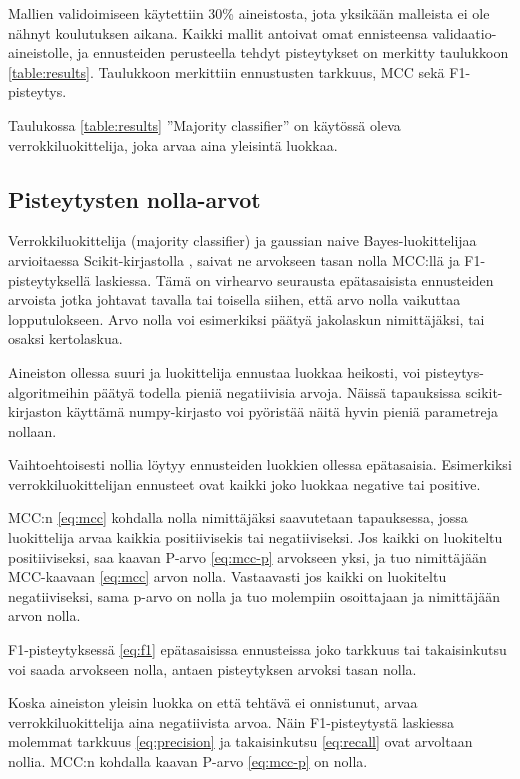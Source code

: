 \documentclass[finnish,twoside,openright]{HYgraduMLDS}
\begin{document}
Mallien validoimiseen käytettiin 30\% aineistosta, jota yksikään malleista ei ole nähnyt koulutuksen aikana. Kaikki mallit antoivat omat ennisteensa validaatio-aineistolle, ja ennusteiden perusteella tehdyt pisteytykset on merkitty taulukkoon \ref{table:results}. Taulukkoon merkittiin ennustusten tarkkuus, MCC sekä F1-pisteytys.

Taulukossa \ref{table:results} ''Majority classifier'' on käytössä oleva verrokkiluokittelija, joka arvaa aina yleisintä luokkaa. 


\subsection{Pisteytysten nolla-arvot}

Verrokkiluokittelija (majority classifier) ja gaussian naive Bayes-luokittelijaa arvioitaessa Scikit-kirjastolla \cite{scikit-learn}, saivat ne arvokseen tasan nolla MCC:llä ja F1-pisteytyksellä laskiessa. Tämä on virhearvo seurausta epätasaisista ennusteiden arvoista jotka johtavat tavalla tai toisella siihen, että arvo nolla vaikuttaa lopputulokseen. Arvo nolla voi esimerkiksi päätyä jakolaskun nimittäjäksi, tai osaksi kertolaskua.

Aineiston ollessa suuri ja luokittelija ennustaa luokkaa heikosti, voi pisteytys-algoritmeihin päätyä todella pieniä negatiivisia arvoja. Näissä tapauksissa scikit-kirjaston \cite{scikit-learn} käyttämä numpy-kirjasto \cite{oliphant2006guide} voi pyöristää näitä hyvin pieniä parametreja nollaan.

Vaihtoehtoisesti nollia löytyy ennusteiden luokkien ollessa epätasaisia. Esimerkiksi verrokkiluokittelijan ennusteet ovat kaikki joko luokkaa negative tai positive.

MCC:n \eqref{eq:mcc} kohdalla nolla nimittäjäksi saavutetaan tapauksessa, jossa luokittelija arvaa kaikkia positiivisekis tai negatiiviseksi. Jos kaikki on luokiteltu positiiviseksi, saa kaavan P-arvo \eqref{eq:mcc-p} arvokseen yksi, ja tuo nimittäjään MCC-kaavaan \eqref{eq:mcc} arvon nolla. Vastaavasti jos kaikki on luokiteltu negatiiviseksi, sama p-arvo on nolla ja tuo molempiin osoittajaan ja nimittäjään arvon nolla.

F1-pisteytyksessä \eqref{eq:f1} epätasaisissa ennusteissa joko tarkkuus tai takaisinkutsu voi saada arvokseen nolla, antaen pisteytyksen arvoksi tasan nolla.

Koska aineiston yleisin luokka on että tehtävä ei onnistunut, arvaa verrokkiluokittelija aina negatiivista arvoa. Näin F1-pisteytystä laskiessa molemmat tarkkuus \eqref{eq:precision} ja takaisinkutsu \eqref{eq:recall} ovat arvoltaan nollia. MCC:n kohdalla kaavan P-arvo \eqref{eq:mcc-p} on nolla.
\end{document}
